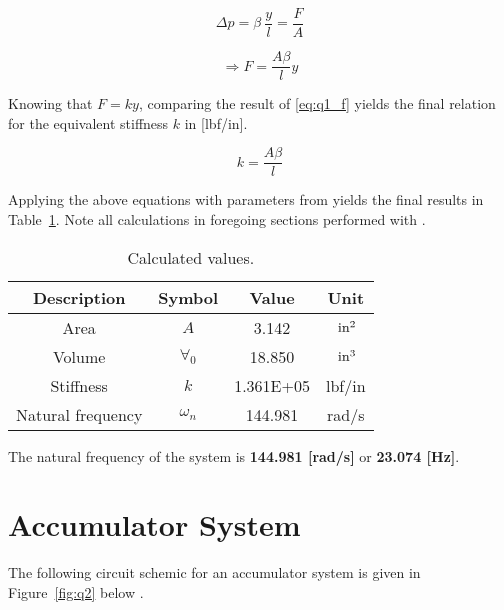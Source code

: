 \begin{equation*}
	\Delta p = \beta \ \frac{y}{l} = \frac{F}{A}
\end{equation*}

\begin{equation}
	\label{eq:q1_f}
	\Rightarrow F = \frac{A\beta}{l}y 	
\end{equation}

Knowing that $F = ky$, comparing the result of \ref{eq:q1_f} yields the final relation for the equivalent stiffness $k$ in [lbf/in]. 

\begin{equation}
	\label{eq:q1_k}
	k = \frac{A\beta}{l} 	
\end{equation}

Applying the above equations with parameters from \cite{assign} yields the final results in Table~\ref{tab:q1_ans}. Note all calculations in foregoing sections performed with \cite{excel}.
 
\begin{table}[H]
	\centering
	\caption{Calculated values.}
	\begin{tabular}{cccc}
		\toprule    
		\textbf{Description} & \textbf{Symbol} & \textbf{Value } & \textbf{Unit} \\
		\midrule
		Area                 & $A$             & 3.142           & $\,\mathrm{in^2}$ \\
		Volume               & $\forall_0$     & 18.850          & $\,\mathrm{in^3}$ \\
		Stiffness            & $k$             & 1.361E+05       & lbf/in        \\
		Natural frequency    & $\omega_n$      & 144.981         & rad/s         \\
		\bottomrule    
	\end{tabular}
	\label{tab:q1_ans}
\end{table}

The natural frequency of the system is \textbf{144.981 [rad/s]} or \textbf{23.074 [Hz]}.

\chapter{Accumulator System}
\label{chap:q2}

The following circuit schemic for an accumulator system is given in Figure~\ref{fig:q2} below \cite{assign}.

